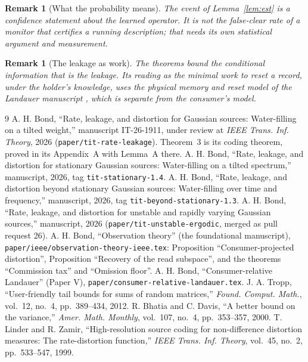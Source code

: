 \documentclass[11pt,onecolumn]{IEEEtran}
\newtheorem{remark}[theorem]{Remark}
\begin{document}
\begin{remark}[What the probability means]
The event of Lemma~\ref{lem:est} is a confidence statement about the learned
operator. It is not the false-clear rate of a monitor that certifies a
running description; that needs its own statistical argument and
measurement.
\end{remark}

\begin{remark}[The leakage as work]
The theorems bound the conditional information that is the leakage. Its
reading as the minimal work to reset a record, under the holder's
knowledge, uses the physical memory and reset model of the Landauer
manuscript \cite{landauer}, which is separate from the consumer's model.
\end{remark}

\begin{thebibliography}{9}
 A. H. Bond, ``Rate, leakage, and distortion for Gaussian
sources: Water-filling on a tilted weight,'' manuscript IT-26-1911, under review at
\emph{IEEE Trans. Inf. Theory}, 2026 (\texttt{paper/tit-rate-leakage}). Theorem~3 is
its coding theorem, proved in its Appendix~A with Lemma~A there.
 A. H. Bond, ``Rate, leakage, and distortion for stationary
Gaussian sources: Water-filling on a tilted spectrum,'' manuscript, 2026,
tag \texttt{tit-stationary-1.4}.
 A. H. Bond, ``Rate, leakage, and distortion beyond
stationary Gaussian sources: Water-filling over time and frequency,''
manuscript, 2026, tag \texttt{tit-beyond-stationary-1.3}.
 A. H. Bond, ``Rate, leakage, and distortion for unstable and
rapidly varying Gaussian sources,'' manuscript, 2026
(\texttt{paper/tit-unstable-ergodic}, merged as pull request 26).
 A. H. Bond, ``Observation theory'' (the foundational
manuscript), \texttt{paper/ieee/observation-theory-ieee.tex}: Proposition
``Consumer-projected distortion'', Proposition ``Recovery of the read
subspace'', and the theorems ``Commission tax'' and ``Omission floor''.
 A. H. Bond, ``Consumer-relative Landauer'' (Paper V),
\texttt{paper/consumer-relative-landauer.tex}.
 J. A. Tropp, ``User-friendly tail bounds for sums of
random matrices,'' \emph{Found. Comput. Math.}, vol.~12, no.~4,
pp.~389--434, 2012.
 R. Bhatia and C. Davis, ``A better bound on the
variance,'' \emph{Amer. Math. Monthly}, vol.~107, no.~4, pp.~353--357, 2000.
 T. Linder and R. Zamir, ``High-resolution source coding
for non-difference distortion measures: The rate-distortion function,''
\emph{IEEE Trans. Inf. Theory}, vol.~45, no.~2, pp.~533--547, 1999.
\end{thebibliography}
\end{document}
